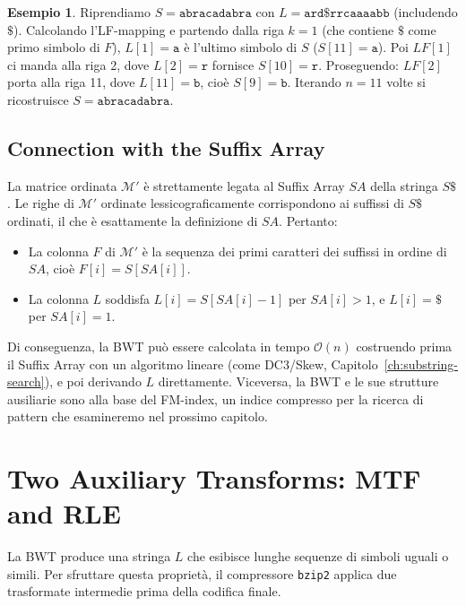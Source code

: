 \documentclass[12pt, a4paper, oneside]{book}
\theoremstyle{plain}
\theoremstyle{definition}
\newtheorem{esempio}[teorema]{Esempio}
\theoremstyle{remark}
\newcommand{\OO}[1]{\mathcal{O}\!\left(#1\right)}
\begin{document}
\begin{esempio}
Riprendiamo $S = \texttt{abracadabra}$ con $L = \texttt{ard\$rrcaaaabb}$ (includendo $\$$). Calcolando l'LF-mapping e partendo dalla riga $k = 1$ (che contiene $\$$ come primo simbolo di $F$), $L[1] = \texttt{a}$ è l'ultimo simbolo di $S$ ($S[11] = \texttt{a}$). Poi $LF[1]$ ci manda alla riga 2, dove $L[2] = \texttt{r}$ fornisce $S[10] = \texttt{r}$. Proseguendo: $LF[2]$ porta alla riga 11, dove $L[11] = \texttt{b}$, cioè $S[9] = \texttt{b}$. Iterando $n = 11$ volte si ricostruisce $S = \texttt{abracadabra}$.
\end{esempio}

\subsection{Connection with the Suffix Array}
\label{subsec:bwt-sa}

La matrice ordinata $\mathcal{M}'$ è strettamente legata al Suffix Array $SA$ della stringa $S\$$. Le righe di $\mathcal{M}'$ ordinate lessicograficamente corrispondono ai suffissi di $S\$$ ordinati, il che è esattamente la definizione di $SA$. Pertanto:
\begin{itemize}
  \item La colonna $F$ di $\mathcal{M}'$ è la sequenza dei primi caratteri dei suffissi in ordine di $SA$, cioè $F[i] = S[SA[i]]$.
  \item La colonna $L$ soddisfa $L[i] = S[SA[i] - 1]$ per $SA[i] > 1$, e $L[i] = \$$ per $SA[i] = 1$.
\end{itemize}

Di conseguenza, la BWT può essere calcolata in tempo $\OO{n}$ costruendo prima il Suffix Array con un algoritmo lineare (come DC3/Skew, Capitolo~\ref{ch:substring-search}), e poi derivando $L$ direttamente. Viceversa, la BWT e le sue strutture ausiliarie sono alla base del FM-index, un indice compresso per la ricerca di pattern che esamineremo nel prossimo capitolo.

\section{Two Auxiliary Transforms: MTF and RLE}
\label{sec:mtf-rle}

La BWT produce una stringa $L$ che esibisce lunghe sequenze di simboli uguali o simili. Per sfruttare questa proprietà, il compressore \texttt{bzip2} applica due trasformate intermedie prima della codifica finale.
\end{document}
